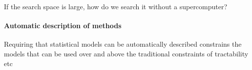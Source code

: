 \documentclass[letterpaper]{article}
\def\ie{i.e.\ }
\newcommand{\procedurename}{ABCD\ }
\begin{document}
If the search space is large, how do we search it without a supercomputer?

\paragraph{Automatic description of methods}

Requiring that statistical models can be automatically described constrains the models that can be used over and above the traditional constraints of tractability etc







\end{document}
